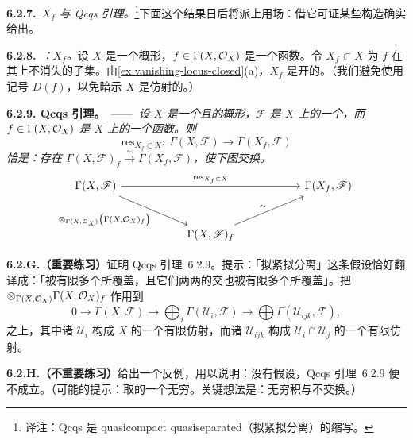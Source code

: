 \textbf{6.2.7.}\ \emph{$X_f$ 与 Qcqs 引理。}\footnote{译注：Qcqs 是 quasicompact quasiseparated（拟紧拟分离）的缩写。}\quad 下面这个结果日后将派上用场：借它可证某些构造确实给出\trQCSheaf。

\textbf{6.2.8.}\ \emph{\trhDefinition{}：$X_f$。}\quad 设 $X$ 是一个概形，$f\in\Gamma(X,\mathcal{O}_X)$ 是一个函数。令 $X_f\subset X$ 为 $f$ 在其上不消失的子集。由\cref{ex:vanishing-locus-closed}(a)，$X_f$ 是开的。（我们避免使用记号 $D(f)$，以免暗示 $X$ 是仿射的。）

\textbf{6.2.9. Qcqs 引理。}\ ——\ \emph{设 $X$ 是一个\trQuasicompact{}且\trQuasiSeparated{}的概形，$\mathscr{F}$ 是 $X$ 上的一个\trQCSheaf，而 $f\in\Gamma(X,\mathcal{O}_X)$ 是 $X$ 上的一个函数。则\trRestrictionMap
\[
\mathrm{res}_{X_f\subset X}\colon\ \Gamma(X,\mathscr{F})\longrightarrow\Gamma(X_f,\mathscr{F})
\]
恰是\trLocalization{}：存在\trIsomorphism{} $\Gamma(X,\mathscr{F})_f\xrightarrow{\ \sim\ }\Gamma(X_f,\mathscr{F})$，使下图交换。}
\[
\begin{tikzcd}[row sep=2.6em, column sep=5.5em]
\Gamma(X,\mathscr{F}) \ar[rr,"\mathrm{res}_{X_f\subset X}"] \ar[dr,"{\otimes_{\Gamma(X,\OO_X)}\bigl(\Gamma(X,\OO_X)_f\bigr)}"'] && \Gamma(X_f,\mathscr{F}) \\
& \Gamma(X,\mathscr{F})_f \ar[ur,"\sim"] &
\end{tikzcd}
\]

\textbf{6.2.G.（重要练习）}\quad 证明 Qcqs 引理~6.2.9。提示：「拟紧拟分离」这条假设恰好翻译成：「被有限多个\trAffine\trOpenSet{}所覆盖，且它们两两的交也被有限多个\trAffine\trOpenSet{}所覆盖」。把\trExact\trFunctor{} $\otimes_{\Gamma(X,\mathcal{O}_X)}\Gamma(X,\mathcal{O}_X)_f$ 作用到\trExactSequence
\[
0\longrightarrow\Gamma(X,\mathscr{F})\longrightarrow\bigoplus_i\Gamma(\mathscr{U}_i,\mathscr{F})\longrightarrow\bigoplus\Gamma(\mathscr{U}_{ijk},\mathscr{F}),
\]
之上，其中诸 $\mathscr{U}_i$ 构成 $X$ 的一个有限仿射\trCover，而诸 $\mathscr{U}_{ijk}$ 构成 $\mathscr{U}_i\cap\mathscr{U}_j$ 的一个有限仿射\trCover。

\textbf{6.2.H.（不重要练习）}\quad 给出一个反例，用以说明：没有\trQuasicompactness{}假设，Qcqs 引理~6.2.9 便不成立。（可能的提示：取\trAffineScheme{}的一个无穷\trDisjointUnion。关键想法是：无穷积与\trLocalization{}不交换。）

